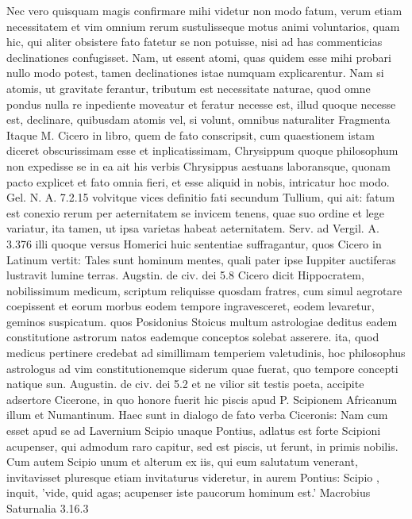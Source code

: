  Nec vero quisquam magis confirmare mihi videtur non modo fatum, verum etiam necessitatem et vim omnium rerum sustulisseque motus animi voluntarios, quam hic, qui aliter obsistere fato fatetur se non potuisse, nisi ad has commenticias declinationes confugisset. Nam, ut essent atomi, quas quidem esse mihi probari nullo modo potest, tamen declinationes istae numquam explicarentur. Nam si atomis, ut gravitate ferantur, tributum est necessitate naturae, quod omne pondus nulla re inpediente moveatur et feratur necesse est, illud quoque necesse est, declinare, quibusdam atomis vel, si volunt, omnibus naturaliter Fragmenta Itaque M. Cicero in libro, quem de fato conscripsit, cum quaestionem istam diceret obscurissimam esse et inplicatissimam, Chrysippum quoque philosophum non expedisse se in ea ait his verbis Chrysippus aestuans laboransque, quonam pacto explicet et fato omnia fieri, et esse aliquid in nobis, intricatur hoc modo. Gel. N. A. 7.2.15 volvitque vices definitio fati secundum Tullium, qui ait: fatum est conexio rerum per aeternitatem se invicem tenens, quae suo ordine et lege variatur, ita tamen, ut ipsa varietas habeat aeternitatem. Serv. ad Vergil. A. 3.376 illi quoque versus Homerici huic sententiae suffragantur, quos Cicero in Latinum vertit: Tales sunt hominum mentes, quali pater ipse Iuppiter auctiferas lustravit lumine terras. Augstin. de civ. dei 5.8 Cicero dicit Hippocratem, nobilissimum medicum, scriptum reliquisse quosdam fratres, cum simul aegrotare coepissent et eorum morbus eodem tempore ingravesceret, eodem levaretur, geminos suspicatum. quos Posidonius Stoicus multum astrologiae deditus eadem constitutione astrorum natos eademque conceptos solebat asserere. ita, quod medicus pertinere credebat ad simillimam temperiem valetudinis, hoc philosophus astrologus ad vim constitutionemque siderum quae fuerat, quo tempore concepti natique sun. Augustin. de civ. dei 5.2 et ne vilior sit testis poeta, accipite adsertore Cicerone, in quo honore fuerit hic piscis apud P. Scipionem Africanum illum et Numantinum. Haec sunt in dialogo de fato verba Ciceronis: Nam cum esset apud se ad Lavernium Scipio unaque Pontius, adlatus est forte Scipioni acupenser, qui admodum raro capitur, sed est piscis, ut ferunt, in primis nobilis. Cum autem Scipio unum et alterum ex iis, qui eum salutatum venerant, invitavisset pluresque etiam invitaturus videretur, in aurem Pontius: Scipio , inquit, 'vide, quid agas; acupenser iste paucorum hominum est.' Macrobius Saturnalia 3.16.3
